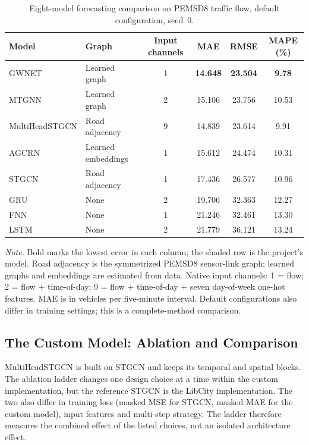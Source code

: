 \begin{table}[htbp]
  \centering
  \small
  \caption{Eight-model forecasting comparison on PEMSD8 traffic flow, default
  configuration, seed~0.}
  \label{tab:forecast-default}
  \begin{tabular}{@{}llcccc@{}}
    \toprule
    Model & Graph & Input channels & MAE & RMSE & MAPE (\%) \\
    \midrule
    GWNET                & Learned graph & 1 & \textbf{14.648} & \textbf{23.504} & \textbf{9.78} \\
    MTGNN                & Learned graph & 2 & 15.106 & 23.756 & 10.53 \\
    \rowcolor{oursrow}
    MultiHeadSTGCN & Road adjacency & 9 & 14.839 & 23.614 & 9.91 \\
    AGCRN                & Learned embeddings & 1 & 15.612 & 24.474 & 10.31 \\
    STGCN                & Road adjacency & 1 & 17.436 & 26.577 & 10.96 \\
    GRU                  & None & 2 & 19.706 & 32.363 & 12.27 \\
    FNN                  & None & 1 & 21.246 & 32.461 & 13.30 \\
    LSTM                 & None & 2 & 21.779 & 36.121 & 13.24 \\
    \bottomrule
  \end{tabular}
  \par\smallskip
  \begin{minipage}{\linewidth}\footnotesize
    \textit{Note.} Bold marks the lowest error in each column; the shaded row is
    the project's model. Road adjacency is the symmetrized PEMSD8 sensor-link
    graph; learned graphs and embeddings are estimated from data. Native input
    channels: 1 = flow; 2 = flow + time-of-day; 9 = flow + time-of-day + seven
    day-of-week one-hot features. MAE is in vehicles per five-minute interval.
    Default configurations also differ in training settings; this is a
    complete-method comparison.
  \end{minipage}
\end{table}

\subsection{The Custom Model: Ablation and Comparison}\label{sec:results-custom}

MultiHeadSTGCN is built on STGCN and keeps its temporal and spatial blocks. The
ablation ladder changes one design choice at a time within the custom
implementation, but the reference STGCN is the LibCity implementation. The two
also differ in training loss (masked MSE for STGCN, masked MAE for the custom
model), input features and multi-step strategy. The ladder therefore measures
the combined effect of the listed choices, not an isolated architecture effect.

